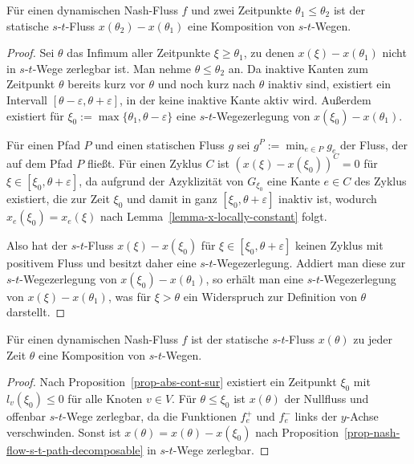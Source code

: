 \begin{proposition}\label{prop-nash-flow-s-t-path-decomposable}
	Für einen dynamischen Nash-Fluss $f$ und zwei Zeitpunkte $\theta_1 \leq \theta_2$ ist der statische $s$-$t$-Fluss $x(\theta_2) - x(\theta_1)$ eine Komposition von $s$-$t$-Wegen.
\end{proposition}
\begin{proof}
	Sei $\theta$ das Infimum aller Zeitpunkte $\xi\geq\theta_1$, zu denen $x(\xi) - x(\theta_1)$ nicht in $s$-$t$-Wege zerlegbar ist.
	Man nehme $\theta \leq \theta_2$ an.
	Da inaktive Kanten zum Zeitpunkt $\theta$ bereits kurz vor $\theta$ und noch kurz nach $\theta$ inaktiv sind, existiert ein Intervall $[\theta - \varepsilon, \theta + \varepsilon]$, in der keine inaktive Kante aktiv wird.
	Außerdem existiert für $\xi_0 := \max \{ \theta_1, \theta - \varepsilon \}$ eine $s$-$t$-Wegezerlegung von $x(\xi_0) - x(\theta_1)$.
	
	Für einen Pfad $P$ und einen statischen Fluss $g$ sei $g^P := \min_{e\in P} g_e$ der Fluss, der auf dem Pfad $P$ fließt.
	Für einen Zyklus $C$ ist $(x(\xi) - x(\xi_0))^C = 0$ für $\xi\in [\xi_0, \theta+\varepsilon]$, da aufgrund der Azyklizität von $G_{\xi_0}$ eine Kante $e\in C$ des Zyklus existiert, die zur Zeit $\xi_0$ und damit in ganz $[\xi_0, \theta+\varepsilon]$ inaktiv ist, wodurch $x_e(\xi_0) = x_e(\xi)$ nach Lemma~\ref{lemma-x-locally-constant} folgt.
	
	Also hat der $s$-$t$-Fluss $x(\xi) - x(\xi_0)$ für $\xi\in [\xi_0, \theta + \varepsilon]$ keinen Zyklus mit positivem Fluss und besitzt daher eine $s$-$t$-Wegezerlegung.
	Addiert man diese zur $s$-$t$-Wegezerlegung von $x(\xi_0) - x(\theta_1)$, so erhält man eine $s$-$t$-Wegezerlegung von $x(\xi) - x(\theta_1)$, was für $\xi > \theta$ ein Widerspruch zur Definition von $\theta$ darstellt.
\end{proof}

\begin{corollary}
	Für einen dynamischen Nash-Fluss $f$ ist der statische $s$-$t$-Fluss $x(\theta)$ zu jeder Zeit $\theta$ eine Komposition von $s$-$t$-Wegen.
\end{corollary}
\begin{proof}
	Nach Proposition~\ref{prop-abs-cont-sur} existiert ein Zeitpunkt $\xi_0$ mit $l_v(\xi_0) \leq 0$ für alle Knoten $v\in V$.
	Für $\theta \leq \xi_0$ ist $x(\theta)$ der Nullfluss und offenbar $s$-$t$-Wege zerlegbar, da die Funktionen $f_e^+$ und $f_e^-$ links der $y$-Achse verschwinden.
	Sonst ist $x(\theta)=  x(\theta) - x(\xi_0)$ nach Proposition~\ref{prop-nash-flow-s-t-path-decomposable} in $s$-$t$-Wege zerlegbar.
\end{proof}